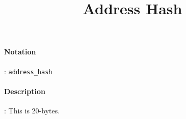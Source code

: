 \documentclass[10pt,a4paper,oneside]{scrartcl}
\author{}
\title{Address Hash}
\date{}
\begin{document}
\maketitle
\paragraph{Notation}: \texttt{address\_hash}
\paragraph{Description}: This is 20-bytes. 
\end{document}
